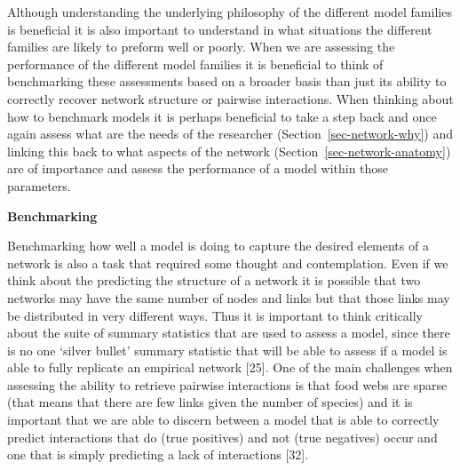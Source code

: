 \documentclass[
]{article}
\begin{document}
\begin{tcolorbox}[enhanced jigsaw, toprule=.15mm, opacitybacktitle=0.6, leftrule=.75mm, bottomtitle=1mm, title=\textcolor{quarto-callout-note-color}{\faInfo}\hspace{0.5em}{Box 2 - Assessing model outputs}, breakable, colbacktitle=quarto-callout-note-color!10!white, colback=white, titlerule=0mm, colframe=quarto-callout-note-color-frame, left=2mm, bottomrule=.15mm, coltitle=black, rightrule=.15mm, toptitle=1mm, arc=.35mm, opacityback=0]

Although understanding the underlying philosophy of the different model
families is beneficial it is also important to understand in what
situations the different families are likely to preform well or poorly.
When we are assessing the performance of the different model families it
is beneficial to think of benchmarking these assessments based on a
broader basis than just its ability to correctly recover network
structure or pairwise interactions. When thinking about how to benchmark
models it is perhaps beneficial to take a step back and once again
assess what are the needs of the researcher
(Section~\ref{sec-network-why}) and linking this back to what aspects of
the network (Section~\ref{sec-network-anatomy}) are of importance and
assess the performance of a model within those parameters.

\textbf{Benchmarking}

Benchmarking how well a model is doing to capture the desired elements
of a network is also a task that required some thought and
contemplation. Even if we think about the predicting the structure of a
network it is possible that two networks may have the same number of
nodes and links but that those links may be distributed in very
different ways. Thus it is important to think critically about the suite
of summary statistics that are used to assess a model, since there is no
one `silver bullet' summary statistic that will be able to assess if a
model is able to fully replicate an empirical network {[}25{]}. One of
the main challenges when assessing the ability to retrieve pairwise
interactions is that food webs are sparse (that means that there are few
links given the number of species) and it is important that we are able
to discern between a model that is able to correctly predict
interactions that do (true positives) and not (true negatives) occur and
one that is simply predicting a lack of interactions {[}32{]}.

\begin{figure}[H]


\end{figure}
\end{tcolorbox}
\end{document}
